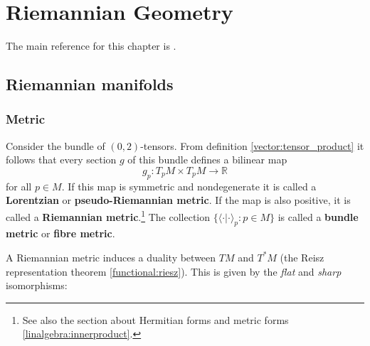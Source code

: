 \chapter{Riemannian Geometry}\label{chapter:riemann}

    The main reference for this chapter is \cite{petersen}.

\section{Riemannian manifolds}
\subsection{Metric}

    \begin{definition}
        Consider the bundle of $(0,2)$-tensors. From definition \ref{vector:tensor_product} it follows that every section $g$ of this bundle defines a bilinear map \[g_p:T_pM\times T_pM\rightarrow\mathbb{R}\] for all $p\in M$. If this map is symmetric and nondegenerate it is called a \textbf{Lorentzian} or \textbf{pseudo-Riemannian metric}. If the map is also positive, it is called a \textbf{Riemannian metric}.\footnote{See also the section about Hermitian forms and metric forms \ref{linalgebra:innerproduct}.} The collection $\{\langle\cdot|\cdot\rangle_p:p\in M\}$ is called a \textbf{bundle metric} or \textbf{fibre metric}.
    \end{definition}

    A Riemannian metric induces a duality between $TM$ and $T^*M$ (the Reisz representation theorem \ref{functional:riesz}). This is given by the \textit{flat} and \textit{sharp} isomorphisms:

